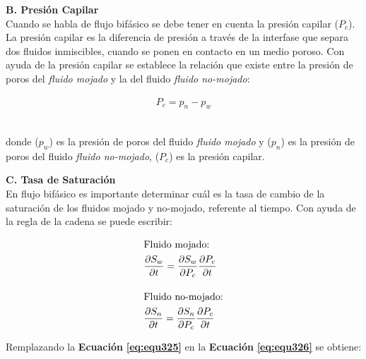 \textbf{B. Presión Capilar}
\\
Cuando se habla de flujo bifásico se debe tener en cuenta la presión capilar ($P_c$). La presión capilar es la diferencia de presión a través de la interfase que separa dos fluidos inmiscibles, cuando se ponen en contacto en un medio poroso. Con ayuda de la presión capilar se establece la relación que existe entre la presión de poros del \textit{fluido mojado} y la del fluido \textit{fluido no-mojado}:

\begin{ceqn} 
\begin{gather} \label{eq:equ325} 
P_c = p_n - p_w
\end{gather}  
\end{ceqn}
\\
donde ($p_w$) es la presión de poros del fluido \textit{fluido mojado} y ($p_n$) es la presión de poros del fluido \textit{fluido no-mojado}, ($P_c$) es la presión capilar.\bigskip


\textbf{C. Tasa de Saturación}
\\
En flujo bifásico es importante determinar cuál es la tasa de cambio de la saturación de los fluidos mojado y no-mojado, referente al tiempo. Con ayuda de la regla de la cadena se puede escribir:

\begin{ceqn} 
\begin{subequations} \label{eq:equ326} 
\begin{align}
\shortintertext{Fluido mojado:} &\frac{\partial S_w}{\partial t} = \frac{\partial S_w}{\partial P_c}\frac{\partial P_c}{\partial t} \label{eq:equ326a} \\[10pt]
\shortintertext{Fluido no-mojado:} 			&\frac{\partial S_n}{\partial t} = \frac{\partial S_n}{\partial P_c}\frac{\partial P_c}{\partial t} \label{eq:equ326b}
\end{align}
\end{subequations} 
\end{ceqn}

\bigskip
Remplazando la \textbf{Ecuación} \textbf{\ref{eq:equ325}} en la \textbf{Ecuación} \textbf{\ref{eq:equ326}} se obtiene:

